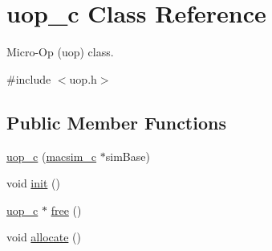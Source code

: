 \hypertarget{classuop__c}{
\section{uop\_\-c Class Reference}
\label{classuop__c}
}


Micro-\/Op (uop) class.  




{\ttfamily \#include $<$uop.h$>$}

\subsection*{Public Member Functions}
\begin{DoxyCompactItemize}
\item 
\hyperlink{classuop__c_a7f548a6f6c150e03fbc39e464925c832}{uop\_\-c} (\hyperlink{classmacsim__c}{macsim\_\-c} $\ast$simBase)
\item 
void \hyperlink{classuop__c_a49ac4c99c80e84769db2b1d9d8ccec4b}{init} ()
\item 
\hyperlink{classuop__c}{uop\_\-c} $\ast$ \hyperlink{classuop__c_ab48dbe63bcb2dfb76feb522e70bdbf80}{free} ()
\item 
void \hyperlink{classuop__c_aa035178717b4db40f8550225d3c8e3b3}{allocate} ()
\end{DoxyCompactItemize}
